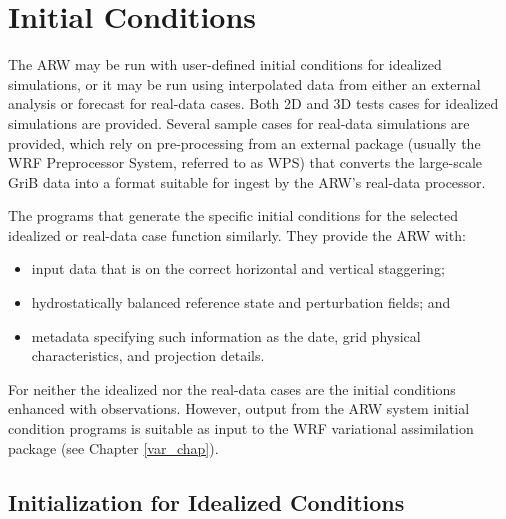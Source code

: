 \chapter{Initial Conditions}
\label{initialization_chap}

The ARW may be run with user-defined initial conditions 
for idealized simulations, or it may be run using
interpolated data from either an external analysis or forecast for
real-data cases.  Both 2D and 3D tests cases for idealized
simulations are provided.  
Several sample cases for real-data simulations are provided, which
rely on pre-processing from an external package (usually the 
WRF Preprocessor System, referred to as WPS) that converts
the large-scale GriB data into a format suitable for ingest by the ARW's
real-data processor.

The programs that generate the specific initial conditions for the selected 
idealized or real-data case function similarly. They provide the ARW with:
\begin{itemize}\setlength{\parskip}{-5pt}
\item input data that is on the correct horizontal and vertical staggering;
\item hydrostatically balanced reference state and perturbation fields; and
\item metadata specifying such information as the date, grid physical characteristics,
and projection details.
\end{itemize}
\noindent For neither the idealized nor the real-data cases
are the initial conditions enhanced with observations.  However, output from 
the ARW system initial condition programs is suitable as input to the WRF variational
assimilation package (see Chapter \ref{var_chap}).

\section{Initialization for Idealized Conditions}

